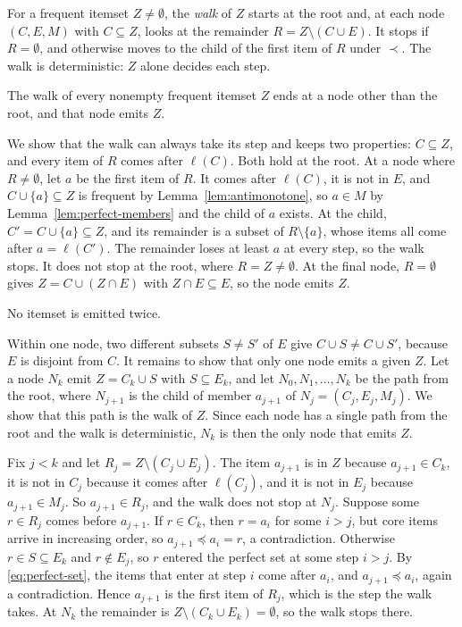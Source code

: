 For a frequent itemset $Z \neq \emptyset$, the \emph{walk} of $Z$ starts at the root and,
at each node $(C, E, M)$ with $C \subseteq Z$, looks at the remainder
$R = Z \setminus (C \cup E)$. It stops if $R = \emptyset$, and otherwise moves to the
child of the first item of $R$ under $\prec$. The walk is deterministic: $Z$ alone decides
each step.

\begin{lemma}[Coverage]
\label{lem:perfect-cover}
The walk of every nonempty frequent itemset $Z$ ends at a node other than the root, and
that node emits $Z$.
\end{lemma}
\begin{IEEEproof}
We show that the walk can always take its step and keeps two properties: $C \subseteq Z$,
and every item of $R$ comes after $\ell(C)$. Both hold at the root. At a node where
$R \neq \emptyset$, let $a$ be the first item of $R$. It comes after $\ell(C)$, it is not
in $E$, and $C \cup \{a\} \subseteq Z$ is frequent by Lemma~\ref{lem:antimonotone}, so
$a \in M$ by Lemma~\ref{lem:perfect-members} and the child of $a$ exists. At the child,
$C' = C \cup \{a\} \subseteq Z$, and its remainder is a subset of $R \setminus \{a\}$,
whose items all come after $a = \ell(C')$. The remainder loses at least $a$ at every
step, so the walk stops. It does not stop at the root, where $R = Z \neq \emptyset$. At
the final node, $R = \emptyset$ gives $Z = C \cup (Z \cap E)$ with $Z \cap E \subseteq E$,
so the node emits $Z$.
\end{IEEEproof}

\begin{lemma}[Uniqueness]
\label{lem:perfect-unique}
No itemset is emitted twice.
\end{lemma}
\begin{IEEEproof}
Within one node, two different subsets $S \neq S'$ of $E$ give $C \cup S \neq C \cup S'$,
because $E$ is disjoint from $C$. It remains to show that only one node emits a given $Z$.
Let a node $N_k$ emit $Z = C_k \cup S$ with $S \subseteq E_k$, and let
$N_0, N_1, \dots, N_k$ be the path from the root, where $N_{j+1}$ is the child of member
$a_{j+1}$ of $N_j = (C_j, E_j, M_j)$. We show that this path is the walk of $Z$. Since
each node has a single path from the root and the walk is deterministic, $N_k$ is then
the only node that emits $Z$.

Fix $j < k$ and let $R_j = Z \setminus (C_j \cup E_j)$. The item $a_{j+1}$ is in $Z$
because $a_{j+1} \in C_k$, it is not in $C_j$ because it comes after $\ell(C_j)$, and it
is not in $E_j$ because $a_{j+1} \in M_j$. So $a_{j+1} \in R_j$, and the walk does not
stop at $N_j$. Suppose some $r \in R_j$ comes before $a_{j+1}$. If $r \in C_k$, then
$r = a_i$ for some $i > j$, but core items arrive in increasing order, so
$a_{j+1} \preceq a_i = r$, a contradiction. Otherwise $r \in S \subseteq E_k$ and
$r \notin E_j$, so $r$ entered the perfect set at some step $i > j$. By
\eqref{eq:perfect-set}, the items that enter at step $i$ come after $a_i$, and
$a_{j+1} \preceq a_i$, again a contradiction. Hence $a_{j+1}$ is the first item of
$R_j$, which is the step the walk takes. At $N_k$ the remainder is
$Z \setminus (C_k \cup E_k) = \emptyset$, so the walk stops there.
\end{IEEEproof}

